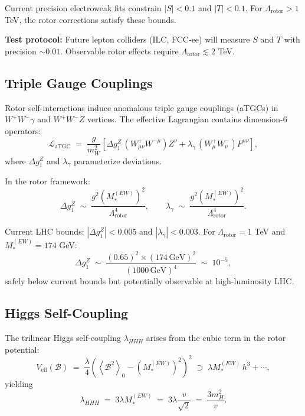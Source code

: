 \documentclass[11pt,a4paper]{article}
\newcommand{\grade}[2]{\left\langle #1 \right\rangle_{#2}}
\newcommand{\scal}[1]{\grade{#1}{0}}
\newcommand{\Biv}{\mathcal{B}}
\newcommand{\Lag}{\mathcal{L}}
\theoremstyle{definition}
\theoremstyle{plain}
\theoremstyle{remark}
\begin{document}
Current precision electroweak fits constrain $|S| < 0.1$ and $|T| < 0.1$. For $\Lambda_{\text{rotor}} > 1$ TeV, the rotor corrections satisfy these bounds.

\textbf{Test protocol:} Future lepton colliders (ILC, FCC-ee) will measure $S$ and $T$ with precision $\sim 0.01$. Observable rotor effects require $\Lambda_{\text{rotor}} \lesssim 2$ TeV.

\subsection{Triple Gauge Couplings}

Rotor self-interactions induce anomalous triple gauge couplings (aTGCs) in $W^+W^-\gamma$ and $W^+W^-Z$ vertices. The effective Lagrangian contains dimension-6 operators:
\begin{equation}
  \Lag_{\text{aTGC}} \;=\; \frac{g}{m_W^2}\left[\Delta g_1^Z\,(W_{\mu\nu}^+W^{-\mu})Z^\nu + \lambda_\gamma\,(W_{\mu}^+W_{\nu}^-)F^{\mu\nu}\right],
\end{equation}
where $\Delta g_1^Z$ and $\lambda_\gamma$ parameterize deviations.

In the rotor framework:
\begin{equation}
  \Delta g_1^Z \;\sim\; \frac{g^2 (M_*^{(EW)})^2}{\Lambda_{\text{rotor}}^4},
  \qquad
  \lambda_\gamma \;\sim\; \frac{g^2 (M_*^{(EW)})^2}{\Lambda_{\text{rotor}}^4}.
\end{equation}

Current LHC bounds: $|\Delta g_1^Z| < 0.005$ and $|\lambda_\gamma| < 0.003$. For $\Lambda_{\text{rotor}} = 1$ TeV and $M_*^{(EW)} = 174$ GeV:
\begin{equation}
  \Delta g_1^Z \;\sim\; \frac{(0.65)^2 \times (174\,\text{GeV})^2}{(1000\,\text{GeV})^4}
  \;\sim\; 10^{-5},
\end{equation}
safely below current bounds but potentially observable at high-luminosity LHC.

\subsection{Higgs Self-Coupling}

The trilinear Higgs self-coupling $\lambda_{HHH}$ arises from the cubic term in the rotor potential:
\begin{equation}
  V_{\text{eff}}(\Biv) \;=\; \frac{\lambda}{4}(\scal{\Biv^2} - (M_*^{(EW)})^2)^2
  \;\supset\; \lambda M_*^{(EW)}\,h^3 + \cdots,
\end{equation}
yielding
\begin{equation}
  \lambda_{HHH} \;=\; 3\lambda M_*^{(EW)} \;=\; 3\lambda\frac{v}{\sqrt{2}}
  \;=\; \frac{3m_H^2}{v}.
\end{equation}
\end{document}

